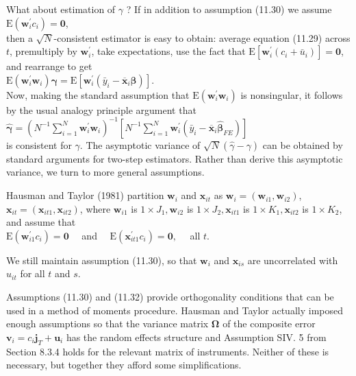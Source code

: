 \documentclass[10pt]{article}
\begin{document}
What about estimation of $\gamma$ ? If in addition to assumption (11.30) we assume\\
$\mathrm{E}\left(\mathbf{w}_{i}^{\prime} c_{i}\right)=\mathbf{0}$,\\
then a $\sqrt{N}$-consistent estimator is easy to obtain: average equation (11.29) across $t$, premultiply by $\mathbf{w}_{i}^{\prime}$, take expectations, use the fact that $\mathrm{E}\left[\mathbf{w}_{i}^{\prime}\left(c_{i}+\bar{u}_{i}\right)\right]=\mathbf{0}$, and rearrange to get\\
$\mathrm{E}\left(\mathbf{w}_{i}^{\prime} \mathbf{w}_{i}\right) \boldsymbol{\gamma}=\mathrm{E}\left[\mathbf{w}_{i}^{\prime}\left(\bar{y}_{i}-\overline{\mathbf{x}}_{i} \boldsymbol{\beta}\right)\right]$.\\
Now, making the standard assumption that $\mathrm{E}\left(\mathbf{w}_{i}^{\prime} \mathbf{w}_{i}\right)$ is nonsingular, it follows by the usual analogy principle argument that\\
$\hat{\boldsymbol{\gamma}}=\left(N^{-1} \sum_{i=1}^{N} \mathbf{w}_{i}^{\prime} \mathbf{w}_{i}\right)^{-1}\left[N^{-1} \sum_{i=1}^{N} \mathbf{w}_{i}^{\prime}\left(\bar{y}_{i}-\overline{\mathbf{x}}_{i} \hat{\boldsymbol{\beta}}_{F E}\right)\right]$\\
is consistent for $\gamma$. The asymptotic variance of $\sqrt{N}(\hat{\gamma}-\gamma)$ can be obtained by standard arguments for two-step estimators. Rather than derive this asymptotic variance, we turn to more general assumptions.

Hausman and Taylor (1981) partition $\mathbf{w}_{i}$ and $\mathbf{x}_{i t}$ as $\mathbf{w}_{i}=\left(\mathbf{w}_{i 1}, \mathbf{w}_{i 2}\right)$, $\mathbf{x}_{i t}= \left(\mathbf{x}_{i t 1}, \mathbf{x}_{i t 2}\right)$, where $\mathbf{w}_{i 1}$ is $1 \times J_{1}, \mathbf{w}_{i 2}$ is $1 \times J_{2}, \mathbf{x}_{i t 1}$ is $1 \times K_{1}, \mathbf{x}_{i t 2}$ is $1 \times K_{2}$, and assume that\\
$\mathrm{E}\left(\mathbf{w}_{i 1}^{\prime} c_{i}\right)=\mathbf{0} \quad$ and $\quad \mathrm{E}\left(\mathbf{x}_{i t 1}^{\prime} c_{i}\right)=\mathbf{0}, \quad$ all $t$.

We still maintain assumption (11.30), so that $\mathbf{w}_{i}$ and $\mathbf{x}_{i s}$ are uncorrelated with $u_{i t}$ for all $t$ and $s$.

Assumptions (11.30) and (11.32) provide orthogonality conditions that can be used in a method of moments procedure. Hausman and Taylor actually imposed enough assumptions so that the variance matrix $\boldsymbol{\Omega}$ of the composite error $\mathbf{v}_{i}=c_{i} \mathbf{j}_{T}+\mathbf{u}_{i}$ has the random effects structure and Assumption SIV. 5 from Section 8.3.4 holds for the relevant matrix of instruments. Neither of these is necessary, but together they afford some simplifications.
\end{document}

